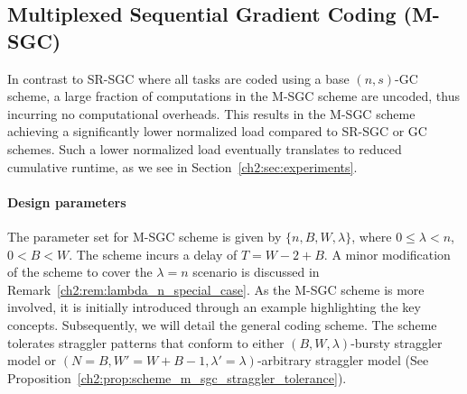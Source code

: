 


\subsection{Multiplexed Sequential Gradient Coding (M-SGC)}\label{ch2:sec:b_sgc}

In contrast to SR-SGC where all tasks are coded using a base $(n,s)$-GC scheme, a large fraction of computations in the M-SGC scheme are uncoded, thus incurring no computational overheads. This results in the M-SGC scheme achieving a significantly lower normalized load compared to SR-SGC or GC schemes. Such a lower normalized load eventually translates to reduced cumulative runtime, as we see in Section~\ref{ch2:sec:experiments}. 

\paragraph{Design parameters} The parameter set for M-SGC scheme is given by $\{n, B, W, \lambda\}$, where $0 \leq \lambda < n$, $0 < B < W$. The scheme incurs a delay of $T= W-2+B$. A minor modification of the scheme to cover the $\lambda=n$ scenario is discussed in Remark~\ref{ch2:rem:lambda_n_special_case}. As the M-SGC scheme is more involved, it is initially introduced through an example highlighting the key concepts. Subsequently, we will detail the general coding scheme. The scheme tolerates straggler patterns that conform to either $(B,W,\lambda)$-bursty straggler model or $(N=B,W'=W+B-1,\lambda'=\lambda)$-arbitrary straggler model (See Proposition~\ref{ch2:prop:scheme_m_sgc_straggler_tolerance}).

